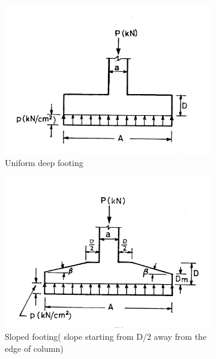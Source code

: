 \documentclass{report}
\begin{document}
\begin{figure}
  \begin{subfigure}[b]{0.5\textwidth}
    \includegraphics[width=\textwidth]{images/fig2291.png}
    \caption{Uniform deep footing}
    \label{fig:1}
  \end{subfigure}
  \begin{subfigure}[b]{0.5\textwidth}
    \includegraphics[width=\textwidth]{images/fig2292.png}
    \caption{Sloped footing( slope starting from D/2 away from the edge of column)}
    \label{fig:2}
  \end{subfigure}
 \begin{subfigure}[b]{0.5\textwidth}

\end{subfigure}
\end{figure}
\end{document}
